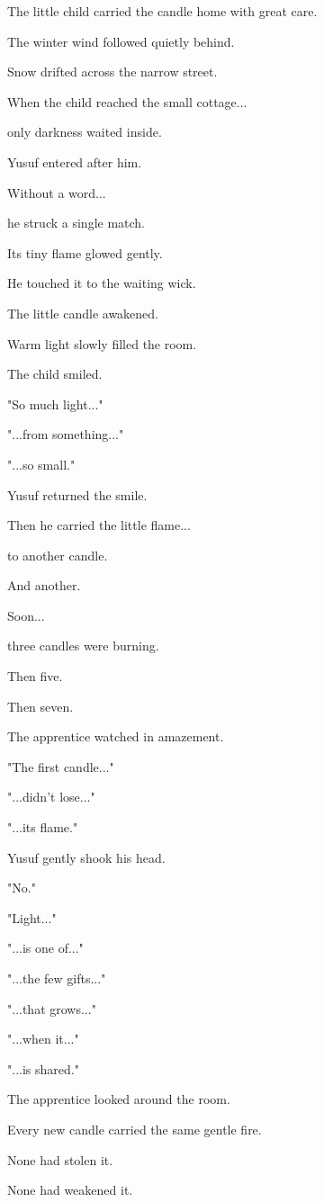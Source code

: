 \documentclass[12pt,openany]{book}
\begin{document}
The little child carried the candle home with great care.

The winter wind followed quietly behind.

Snow drifted across the narrow street.

When the child reached the small cottage...

only darkness waited inside.

Yusuf entered after him.

Without a word...

he struck a single match.

Its tiny flame glowed gently.

He touched it to the waiting wick.

The little candle awakened.

Warm light slowly filled the room.

The child smiled.

"So much light..."

"...from something..."

"...so small."

Yusuf returned the smile.

Then he carried the little flame...

to another candle.

And another.

Soon...

three candles were burning.

Then five.

Then seven.

The apprentice watched in amazement.

"The first candle..."

"...didn't lose..."

"...its flame."

Yusuf gently shook his head.

"No."

"Light..."

"...is one of..."

"...the few gifts..."

"...that grows..."

"...when it..."

"...is shared."

The apprentice looked around the room.

Every new candle carried the same gentle fire.

None had stolen it.

None had weakened it.
\end{document}
